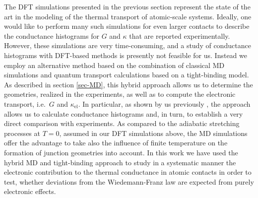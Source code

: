 \documentclass[aps,amsmath,amssymb,twocolumn,showpacs]{revtex4-1}
\begin{document}
The DFT simulations presented in the previous section represent the state of
the art in the modeling of the thermal transport of atomic-scale
systems. Ideally, one would like to perform many such simulations for even
larger contacts to describe the conductance histograms for $G$ and $\kappa$
that are reported experimentally. However, these simulations are very
time-consuming, and a study of conductance histograms with DFT-based methods
is presently not feasible for us. Instead we employ an alternative method
based on the combination of classical MD simulations and quantum transport
calculations based on a tight-binding model. As described in section
\ref{sec-MD}, this hybrid approach allows us to determine the geometries,
realized in the experiments, as well as to compute the electronic transport,
i.e.\ $G$ and $\kappa_{\text{el}}$. In particular, as shown by us previously
\cite{Dreher2005,Pauly2006,Evangeli2015,Cui2017}, the approach allows us to
calculate conductance histograms and, in turn, to establish a very direct
comparison with experiments. As compared to the adiabatic
stretching processes at $T=0$, assumed in our DFT simulations above, the MD
simulations offer the advantage to take also the influence of finite
temperature on the formation of junction geometries into account. In this
work we have used the hybrid MD and tight-binding approach to study in a
systematic manner the electronic contribution to the thermal conductance in
atomic contacts in order to test, whether deviations from the Wiedemann-Franz
law are expected from purely electronic effects.
\end{document}
